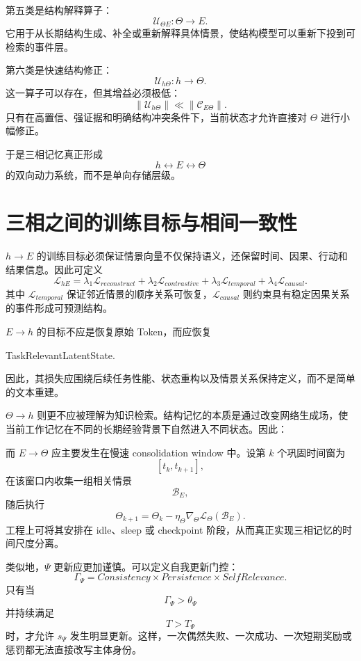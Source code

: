 第五类是结构解释算子：
\[
\mathcal{U}_{\Theta E}:
\Theta
\rightarrow
E.
\]
它用于从长期结构生成、补全或重新解释具体情景，使结构模型可以重新下投到可检索的事件层。

第六类是快速结构修正：
\[
\mathcal{U}_{h\Theta}:
h
\rightarrow
\Theta.
\]
这一算子可以存在，但其增益必须极低：
\[
\left\|
\mathcal{U}_{h\Theta}
\right\|
\ll
\left\|
\mathcal{C}_{E\Theta}
\right\|.
\]
只有在高置信、强证据和明确结构冲突条件下，当前状态才允许直接对 $\Theta$ 进行小幅修正。

于是三相记忆真正形成
\[
h
\leftrightarrow
E
\leftrightarrow
\Theta
\]
的双向动力系统，而不是单向存储层级。

\section{三相之间的训练目标与相间一致性}

$h\rightarrow E$ 的训练目标必须保证情景向量不仅保持语义，还保留时间、因果、行动和结果信息。因此可定义
\[
\mathcal{L}_{hE}
=
\lambda_1\mathcal{L}_{reconstruct}
+
\lambda_2\mathcal{L}_{contrastive}
+
\lambda_3\mathcal{L}_{temporal}
+
\lambda_4\mathcal{L}_{causal}.
\]
其中 $\mathcal{L}_{temporal}$ 保证邻近情景的顺序关系可恢复，$\mathcal{L}_{causal}$ 则约束具有稳定因果关系的事件形成可预测结构。

$E\rightarrow h$ 的目标不应是恢复原始 Token，而应恢复
\begin{statementbox}
TaskRelevantLatentState.
\end{statementbox}
因此，其损失应围绕后续任务性能、状态重构以及情景关系保持定义，而不是简单的文本重建。

$\Theta\rightarrow h$ 则更不应被理解为知识检索。结构记忆的本质是通过改变网络生成场，使当前工作记忆在不同的长期经验背景下自然进入不同状态。因此：
\begin{statementbox}
\centering
{}
\end{statementbox}

而 $E\rightarrow\Theta$ 应主要发生在慢速 consolidation window 中。设第 $k$ 个巩固时间窗为
\[
[t_k,t_{k+1}],
\]
在该窗口内收集一组相关情景
\[
\mathcal{B}_E,
\]
随后执行
\[
\Theta_{k+1}
=
\Theta_k
-
\eta_\Theta
\nabla_\Theta
\mathcal{L}_\Theta
\left(
\mathcal{B}_E
\right).
\]
工程上可将其安排在 idle、sleep 或 checkpoint 阶段，从而真正实现三相记忆的时间尺度分离。

类似地，$\Psi$ 更新应更加谨慎。可以定义自我更新门控：
\[
\Gamma_\Psi
=
Consistency
\times
Persistence
\times
SelfRelevance.
\]
只有当
\[
\Gamma_\Psi
>
\theta_\Psi
\]
并持续满足
\[
T
>
T_\Psi
\]
时，才允许 $s_\Psi$ 发生明显更新。这样，一次偶然失败、一次成功、一次短期奖励或惩罚都无法直接改写主体身份。


